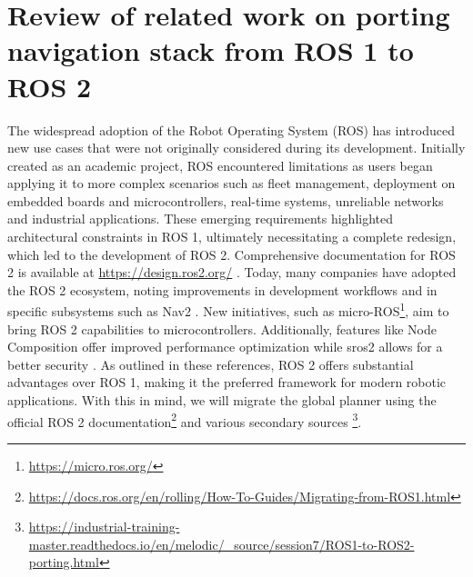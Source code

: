 \section{Review of related work on porting navigation stack from ROS 1 to ROS 2}\label{lab:port12}
The widespread adoption of the Robot Operating System (ROS) has introduced new use cases that were not originally considered during its development. Initially created as an academic project, ROS encountered limitations as users began applying it to more complex scenarios such as fleet management, deployment on embedded boards and microcontrollers, real-time systems, unreliable networks and industrial applications. These emerging requirements highlighted architectural constraints in ROS 1, ultimately necessitating a complete redesign, which led to the development of ROS 2. Comprehensive documentation for ROS 2 is available at \href{https://design.ros2.org/}{https://design.ros2.org/} . Today, many companies have adopted the ROS 2 ecosystem, noting improvements in development workflows \cite{Macenski_2022} and in specific subsystems such as  Nav2 \cite{macenski2023survey}. New initiatives, such as micro-ROS\footnote{\href{https://micro.ros.org/}{https://micro.ros.org/}}, aim to bring ROS 2 capabilities to microcontrollers. Additionally, features like Node Composition offer improved performance optimization \cite{macenski2023impactros2node} while sros2 allows for a better security \cite{vilches2022sros2usablecybersecurity}.
As outlined in these references, ROS 2 offers substantial advantages over ROS 1, making it the preferred framework for modern robotic applications. With this in mind, we will migrate the global planner using the official ROS 2 documentation\footnote{\href{https://docs.ros.org/en/rolling/How-To-Guides/Migrating-from-ROS1.html}{https://docs.ros.org/en/rolling/How-To-Guides/Migrating-from-ROS1.html}} and various secondary sources \footnote{\href{https://industrial-training-master.readthedocs.io/en/melodic/\_source/session7/ROS1-to-ROS2-porting.html}{https://industrial-training-master.readthedocs.io/en/melodic/\_source/session7/ROS1-to-ROS2-porting.html}}. 

